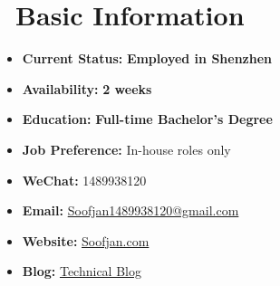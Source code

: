 \documentclass{resume}
\begin{document}


\section{\faInfoCircle\ Basic Information}
\vspace{0.5ex}
\begin{minipage}[t]{0.48\textwidth}
\begin{itemize}[label=,leftmargin=*]
\large
\item \textbf{Current Status:} \textbf{Employed in Shenzhen}
\item \textbf{Availability:} \textbf{2 weeks}
\item \textbf{Education:} \textbf{Full-time Bachelor's Degree}
\item \textbf{Job Preference:} In-house roles only 
\end{itemize}
\end{minipage}\hfill
\begin{minipage}[t]{0.48\textwidth}
\begin{itemize}[label=,leftmargin=*]
\large
\item \textbf{WeChat:} 1489938120
\item \textbf{Email:} \href{mailto:Soofjan1489938120@gmail.com}{Soofjan1489938120@gmail.com}
\item \textbf{Website:} \href{https://Soofjan.com}{Soofjan.com}
\item \textbf{Blog:} \href{https://juejin.cn/user/4074147977125020}{Technical Blog}
\end{itemize}
\end{minipage}
\end{document}
